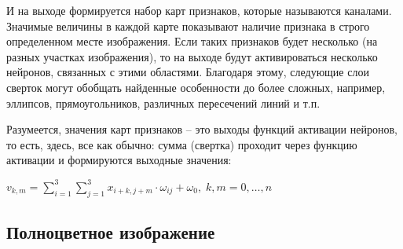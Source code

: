 \documentclass{article}
\begin{document}
	И на выходе формируется набор карт признаков, которые называются каналами. Значимые величины в каждой карте показывают наличие признака в строго определенном месте изображения. Если таких признаков будет несколько (на разных участках изображения), то на выходе будут активироваться несколько нейронов, связанных с этими областями. Благодаря этому, следующие слои сверток могут обобщать найденные особенности до более сложных, например, эллипсов, прямоугольников, различных пересечений линий и т.п.

	Разумеется, значения карт признаков – это выходы функций активации нейронов, то есть, здесь, все как обычно: сумма (свертка) проходит через функцию активации и формируются выходные значения:

	$v_{k,m} = \sum\limits_{i=1}^{3} \sum\limits_{j=1}^{3} x_{i+k, j+m} \cdot \omega_{ij} + \omega_0, \; k,m = 0, \dots, n$\\
	
	\subsection{Полноцветное изображение}
	
	\begin{figure}[h]
		\begin{minipage}[h]{0.49\linewidth}
		\end{minipage}
		\hfill
		\begin{minipage}[h]{0.49\linewidth}
		\end{minipage}
	\end{figure}
	
\end{document}
